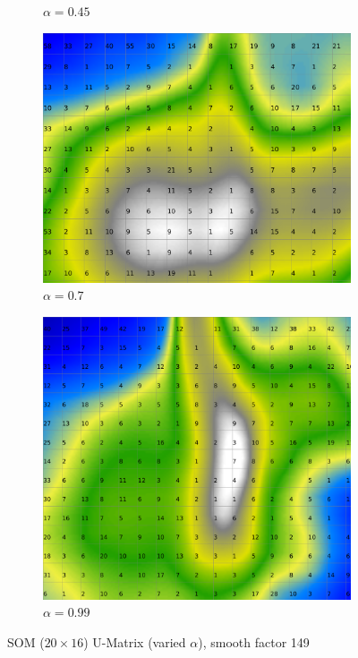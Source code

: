 \documentclass{acm_proc_article-sp}
\begin{document}
\begin{figure}
\begin{subfigure}[b]{0.24\linewidth}
        \caption{$\alpha=0.45$}
        \label{fig:wine-20x16-smoothed-data-histogram-alpha-0,45-f-149}
    \end{subfigure}
    \begin{subfigure}[b]{0.24\linewidth}
        \includegraphics[width=\linewidth]{img/wine-20x16-smoothed-data-histogram-alpha-0,7-f-149}
        \caption{$\alpha=0.7$}
        \label{fig:wine-20x16-smoothed-data-histogram-alpha-0,7-f-149}
    \end{subfigure}
    \begin{subfigure}[b]{0.24\linewidth}
        \includegraphics[width=\linewidth]{img/wine-20x16-smoothed-data-histogram-alpha-0,99-f-149}
        \caption{$\alpha=0.99$}
        \label{fig:wine-20x16-smoothed-data-histogram-alpha-0,99-f-149}
    \end{subfigure}
    \caption{SOM ($20\times16$) U-Matrix (varied $\alpha$), smooth factor 149}
    \label{fig:wine-20x16-smoothed-data-histogram-alpha-f-149}
\end{figure}
\end{document}
